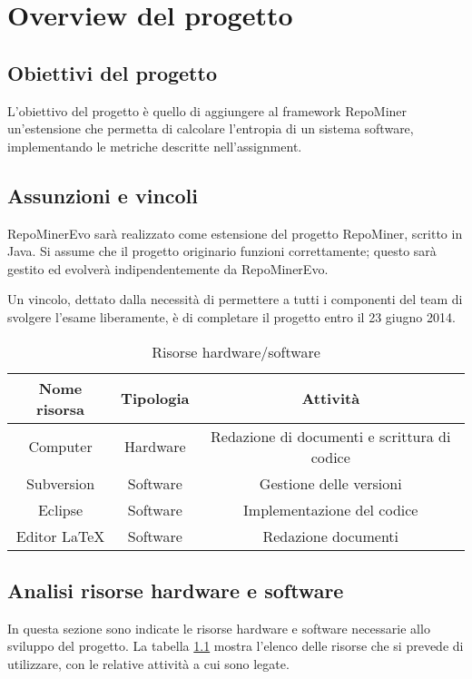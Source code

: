 \chapter{Overview del progetto}
\section{Obiettivi del progetto}
L'obiettivo del progetto è quello di aggiungere al framework RepoMiner un'estensione che permetta di calcolare l'entropia di un sistema software, implementando le metriche descritte nell'assignment.

\section{Assunzioni e vincoli}
RepoMinerEvo sarà realizzato come estensione del progetto RepoMiner, scritto in Java. Si assume che il progetto originario funzioni correttamente; questo sarà gestito ed evolverà indipendentemente da RepoMinerEvo.

Un vincolo, dettato dalla necessità di permettere a tutti i componenti del team di svolgere l'esame liberamente, è di completare il progetto entro il 23 giugno 2014. 
\begin{table}[b]
	\begin{tabular}{|c|c|c|}
	\hline
	\textbf{Nome risorsa} & \textbf{Tipologia} & \textbf{Attività}\\
	\hline
	Computer	& Hardware	& Redazione di documenti e scrittura di codice\\
	\hline
	Subversion	& Software	& Gestione delle versioni\\
	\hline
	Eclipse		& Software	& Implementazione del codice\\
	\hline
	Editor \LaTeX & Software& Redazione documenti\\
	\hline
	\end{tabular}
	\caption{Risorse hardware/software}
	\label{overview:risorsehwsw}
\end{table}
\section{Analisi risorse hardware e software}
In questa sezione sono indicate le risorse hardware e software necessarie allo sviluppo del progetto. La tabella \ref{overview:risorsehwsw} mostra l'elenco delle risorse che si prevede di utilizzare, con le relative attività a cui sono legate.

